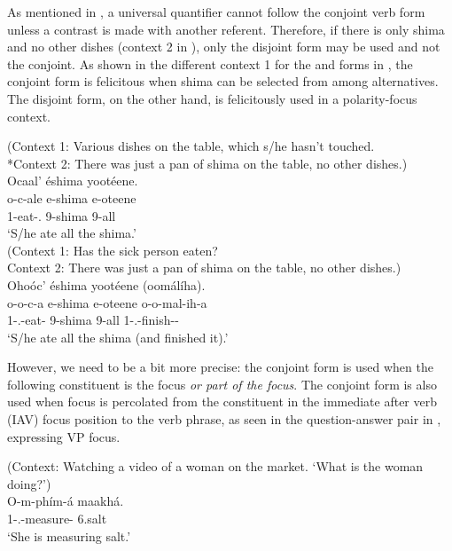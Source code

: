 \documentclass[output=paper]{langscibook}
\begin{document}
\z

As mentioned in \citet{vanderWal2011}, a universal quantifier cannot follow the conjoint verb form unless a contrast is made with another referent. Therefore, if there is only shima and no other dishes (context 2 in ), only the disjoint form may be used and not the conjoint. As shown in the different context 1 for the \CJ{} and \DJ{} forms in , the conjoint form is felicitous when shima can be selected from among alternatives. The disjoint form, on the other hand, is felicitously used in a polarity-focus context.

\ea
\begin{xlist}
\exi{\CJ}
\label{bkm:Ref109482986}
(Context 1: Various dishes on the table, which s/he hasn’t touched.\\
*Context 2: There was just a pan of shima on the table, no other dishes.)\\
Ocaal’ éshima yootéene.\\
\gll
o-c-ale  e-shima  e-oteene\\
1\SM{}-eat-\PFV{}.\CJ{}  9-shima  9-all\\
\glt
‘S/he ate all the shima.’\\

\exi{\DJ}
(Context 1: Has the sick person eaten?\\
Context 2: There was just a pan of shima on the table, no other dishes.)\\
Ohoóc’ éshima yootéene (oomálíha).\\
\gll
o-o-c-a  e-shima  e-oteene  o-o-mal-ih-a\\
1\SM{}-\PFV{}.\DJ{}-eat-\FV{}  9-shima  9-all  1\SM{}-\PFV{}.\DJ{}-finish-\CAUS{}-\FV{}\\
\glt 
‘S/he ate all the shima (and finished it).’


\end{xlist}
\z

However, we need to be a bit more precise: the conjoint form is used when the following constituent is the focus \textit{or part of the focus}. The conjoint form is also used when focus is percolated from the constituent in the immediate after verb (IAV) focus position to the verb phrase, as seen in the question-answer pair in , expressing VP focus.

\ea
\label{bkm:Ref95382615}
(Context: Watching a video of a woman on the market. ‘What is the woman doing?’)\\
\gll
O-m{}-phím{}-á  maakhá.\\
1\SM{}-\PRS{}.\CJ{}-measure-\FV{}  6.salt\\
\glt
‘She is measuring salt.’\\
\end{document}
